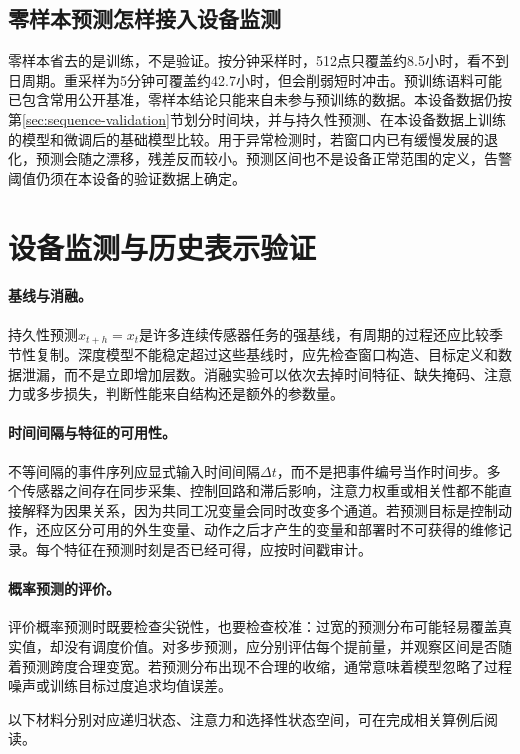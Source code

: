 \subsection{零样本预测怎样接入设备监测}
零样本省去的是训练，不是验证。按分钟采样时，512点只覆盖约8.5小时，看不到日周期。重采样为5分钟可覆盖约42.7小时，但会削弱短时冲击。预训练语料可能已包含常用公开基准，零样本结论只能来自未参与预训练的数据。本设备数据仍按第\ref{sec:sequence-validation}节划分时间块，并与持久性预测、在本设备数据上训练的模型和微调后的基础模型比较。用于异常检测时，若窗口内已有缓慢发展的退化，预测会随之漂移，残差反而较小。预测区间也不是设备正常范围的定义，告警阈值仍须在本设备的验证数据上确定。

\section{设备监测与历史表示验证}
\paragraph{基线与消融。}
持久性预测$\hat x_{t+h}=x_t$是许多连续传感器任务的强基线，有周期的过程还应比较季节性复制。深度模型不能稳定超过这些基线时，应先检查窗口构造、目标定义和数据泄漏，而不是立即增加层数。消融实验可以依次去掉时间特征、缺失掩码、注意力或多步损失，判断性能来自结构还是额外的参数量。

\paragraph{时间间隔与特征的可用性。}
不等间隔的事件序列应显式输入时间间隔$\Delta t$，而不是把事件编号当作时间步。多个传感器之间存在同步采集、控制回路和滞后影响，注意力权重或相关性都不能直接解释为因果关系，因为共同工况变量会同时改变多个通道。若预测目标是控制动作，还应区分可用的外生变量、动作之后才产生的变量和部署时不可获得的维修记录。每个特征在预测时刻是否已经可得，应按时间戳审计。

\paragraph{概率预测的评价。}
评价概率预测时既要检查尖锐性，也要检查校准：过宽的预测分布可能轻易覆盖真实值，却没有调度价值。对多步预测，应分别评估每个提前量，并观察区间是否随着预测跨度合理变宽。若预测分布出现不合理的收缩，通常意味着模型忽略了过程噪声或训练目标过度追求均值误差。

以下材料分别对应递归状态、注意力和选择性状态空间，可在完成相关算例后阅读。
